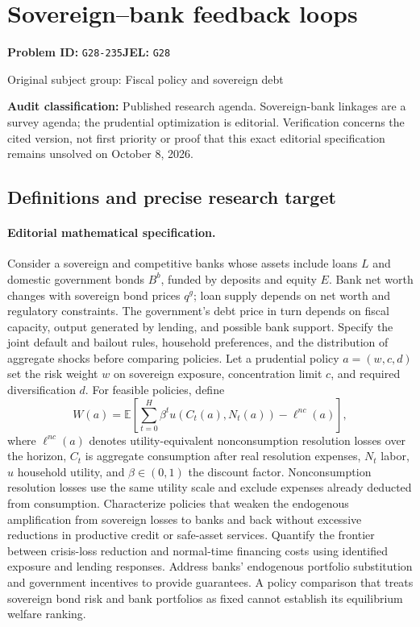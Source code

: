 \documentclass[11pt,a4paper]{article}
\begin{document}
\section*{Sovereign–bank feedback loops}
\textbf{Problem ID:} \texttt{G28-235}\quad \textbf{JEL:} \texttt{G28}\par
\label{problem:OP-0255}
{\sffamily\small\color{muted}Original subject group: Fiscal policy and sovereign debt\par}
\label{definitions:problem:30007536}
\textbf{Audit classification:} Published research agenda. Sovereign-bank linkages are a survey agenda; the prudential optimization is editorial. Verification concerns the cited version, not first priority or proof that this exact editorial specification remains unsolved on October 8, 2026.
\subsection*{Definitions and precise research target}
\paragraph{Editorial mathematical specification.} Consider a sovereign and competitive banks whose assets include loans \(L\) and domestic government bonds \(B^b\), funded by deposits and equity \(E\). Bank net worth changes with sovereign bond prices \(q^g\); loan supply depends on net worth and regulatory constraints. The government’s debt price in turn depends on fiscal capacity, output generated by lending, and possible bank support. Specify the joint default and bailout rules, household preferences, and the distribution of aggregate shocks before comparing policies.
Let a prudential policy \(a=(w,c,d)\) set the risk weight \(w\) on sovereign exposure, concentration limit \(c\), and required diversification \(d\). For feasible policies, define
\[
W(a)=\mathbb{E}\left[\sum_{t=0}^{H}\beta^t u(C_t(a),N_t(a))-\ell^{nc}(a)\right],
\]
where \(\ell^{nc}(a)\) denotes utility-equivalent nonconsumption resolution losses over the horizon, \(C_t\) is aggregate consumption after real resolution expenses, \(N_t\) labor, \(u\) household utility, and \(\beta\in(0,1)\) the discount factor. Nonconsumption resolution losses use the same utility scale and exclude expenses already deducted from consumption. Characterize policies that weaken the endogenous amplification from sovereign losses to banks and back without excessive reductions in productive credit or safe-asset services. Quantify the frontier between crisis-loss reduction and normal-time financing costs using identified exposure and lending responses. Address banks’ endogenous portfolio substitution and government incentives to provide guarantees. A policy comparison that treats sovereign bond risk and bank portfolios as fixed cannot establish its equilibrium welfare ranking.
\end{document}
